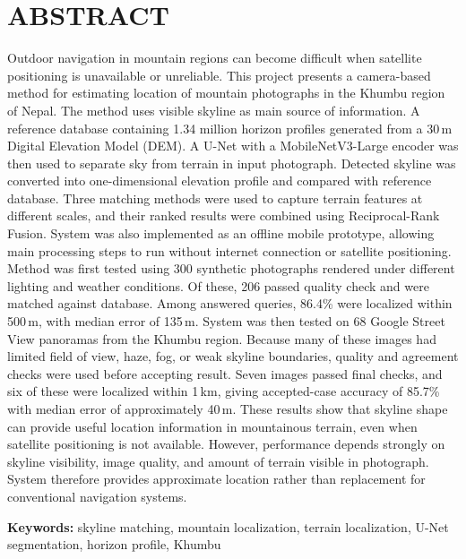 \chapter*{ABSTRACT}
\noindent
Outdoor navigation in mountain regions can become difficult when satellite positioning is unavailable or unreliable. This project presents a camera-based method for estimating location of mountain photographs in the Khumbu region of Nepal. The method uses visible skyline as main source of information. A reference database containing 1.34 million horizon profiles generated from a 30\,m Digital Elevation Model (DEM). A U-Net with a MobileNetV3-Large encoder was then used to separate sky from terrain in input photograph. Detected skyline was converted into one-dimensional elevation profile and compared with reference database. Three matching methods were used to capture terrain features at different scales, and their ranked results were combined using Reciprocal-Rank Fusion. System was also implemented as an offline mobile prototype, allowing main processing steps to run without internet connection or satellite positioning. Method was first tested using 300 synthetic photographs rendered under different lighting and weather conditions. Of these, 206 passed quality check and were matched against database. Among answered queries, 86.4\% were localized within 500\,m, with median error of 135\,m. System was then tested on 68 Google Street View panoramas from the Khumbu region. Because many of these images had limited field of view, haze, fog, or weak skyline boundaries, quality and agreement checks were used before accepting result. Seven images passed final checks, and six of these were localized within 1\,km, giving accepted-case accuracy of 85.7\% with median error of approximately 40\,m. These results show that skyline shape can provide useful location information in mountainous terrain, even when satellite positioning is not available. However, performance depends strongly on skyline visibility, image quality, and amount of terrain visible in photograph. System therefore provides approximate location rather than replacement for conventional navigation systems.

\smallskip
\noindent\textbf{Keywords:} skyline matching, mountain localization, terrain localization, U-Net segmentation, horizon profile, Khumbu

